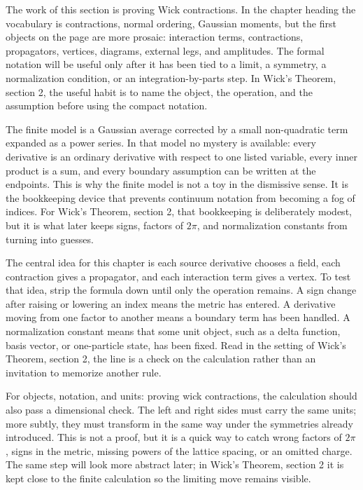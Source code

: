The work of this section is proving Wick contractions.  In the chapter heading the vocabulary is contractions, normal ordering, Gaussian moments, but the first objects on the page are more prosaic: interaction terms, contractions, propagators, vertices, diagrams, external legs, and amplitudes.  The formal notation will be useful only after it has been tied to a limit, a symmetry, a normalization condition, or an integration-by-parts step.  In Wick's Theorem, section 2, the useful habit is to name the object, the operation, and the assumption before using the compact notation.

The finite model is a Gaussian average corrected by a small non-quadratic term expanded as a power series.  In that model no mystery is available: every derivative is an ordinary derivative with respect to one listed variable, every inner product is a sum, and every boundary assumption can be written at the endpoints.  This is why the finite model is not a toy in the dismissive sense.  It is the bookkeeping device that prevents continuum notation from becoming a fog of indices.  For Wick's Theorem, section 2, that bookkeeping is deliberately modest, but it is what later keeps signs, factors of \(2\pi\), and normalization constants from turning into guesses.

The central idea for this chapter is each source derivative chooses a field, each contraction gives a propagator, and each interaction term gives a vertex.  To test that idea, strip the formula down until only the operation remains.  A sign change after raising or lowering an index means the metric has entered.  A derivative moving from one factor to another means a boundary term has been handled.  A normalization constant means that some unit object, such as a delta function, basis vector, or one-particle state, has been fixed.  Read in the setting of Wick's Theorem, section 2, the line is a check on the calculation rather than an invitation to memorize another rule.

For objects, notation, and units: proving wick contractions, the calculation should also pass a dimensional check.  The left and right sides must carry the same units; more subtly, they must transform in the same way under the symmetries already introduced.  This is not a proof, but it is a quick way to catch wrong factors of \(2\pi\), signs in the metric, missing powers of the lattice spacing, or an omitted charge.  The same step will look more abstract later; in Wick's Theorem, section 2 it is kept close to the finite calculation so the limiting move remains visible.

